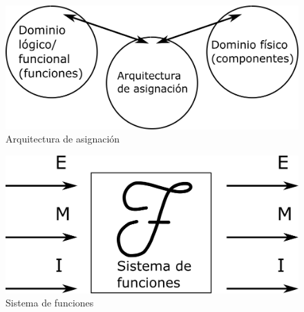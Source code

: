 \begin{figure}[h!]
    \centering
        \includegraphics[scale=0.30]{Proyecto Integrador Figuras/03 Arquitectura de asignacion.png}
        \caption{Arquitectura de asignación}
\end{figure}

\begin{figure}[h!]
    \centering
        \includegraphics[scale=0.30]{Proyecto Integrador Figuras/04 Sistema de funciones.png}
        \caption{Sistema de funciones}
\end{figure}